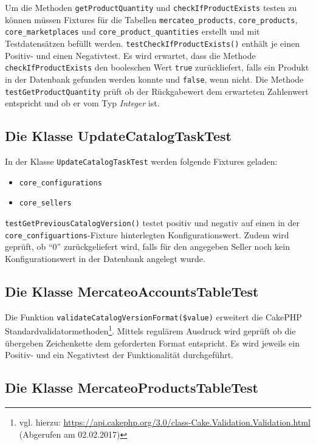 {	Um die Methoden \texttt{getProductQuantity} und \texttt{checkIfProductExists} testen zu können müssen Fixtures für die Tabellen \texttt{mercateo\_products}, \texttt{core\_products}, \texttt{core\_marketplaces} und \texttt{core\_product\_quantities} erstellt und mit Testdatensätzen befüllt werden.
	\texttt{testCheckIfProductExists()} enthält je einen Positiv- und einen Negativtest. Es wird erwartet, dass die Methode \texttt{checkIfProductExists} den booleschen Wert \texttt{true} zurückliefert, falls ein Produkt in der Datenbank gefunden werden konnte und \texttt{false}, wenn nicht.
	Die Methode \texttt{testGetProductQuantity} prüft ob der Rückgabewert dem erwarteten Zahlenwert entspricht und ob er vom Typ \textit{Integer} ist.
	
	\subsection{Die Klasse UpdateCatalogTaskTest}
	
	In der Klasse \texttt{UpdateCatalogTaskTest} werden folgende Fixtures geladen:
	\begin{itemize}[nosep]
		\item \texttt{core\_configurations}
		\item \texttt{core\_sellers}

		
	\end{itemize}
	
	\texttt{testGetPreviousCatalogVersion()} testet positiv und negativ auf einen in der \texttt{core\_configuartions}-Fixture hinterlegten Konfigurationswert. Zudem wird geprüft, ob \enquote{0} zurückgeliefert wird, falls für den angegeben Seller noch kein Konfigurationswert in der Datenbank angelegt wurde.
	

	
	\subsection{Die Klasse MercateoAccountsTableTest}
	
	Die Funktion \texttt{validateCatalogVersionFormat(\$value)} erweitert die CakePHP Standardvalidatormethoden\footnote{vgl. hierzu: \url{https://api.cakephp.org/3.0/class-Cake.Validation.Validation.html} (Abgerufen am 02.02.2017) }. Mittels regulärem Ausdruck wird geprüft ob die übergeben Zeichenkette dem  geforderten Format entspricht. Es wird jeweils ein Positiv- und ein Negativtest der Funktionalität durchgeführt. 
	
	\subsection{Die Klasse MercateoProductsTableTest}
	
}
